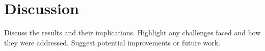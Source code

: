 \documentclass[a4paper,12pt]{article}
\begin{document}

\section{Discussion}
Discuss the results and their implications. Highlight any challenges faced and how they were addressed. Suggest potential improvements or future work.



\end{document}
